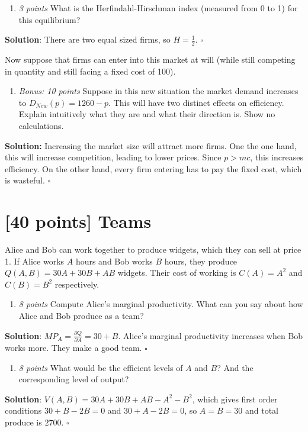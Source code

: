 \documentclass{article}
\begin{document}
\begin{enumerate}[resume*]
\item \textit{3 points }What is the Herfindahl-Hirschman index (measured from 0 to 1) for this equilibrium?\end{enumerate}
\textbf{Solution}:
There are two equal sized firms, so $H=\frac 12$. $\square$

Now suppose that firms can enter into this market at will (while still competing in quantity and still facing a fixed cost of 100).

\begin{enumerate}[resume*]
  \item \textit{Bonus: 10 points }Suppose in this new situation the market demand increases to $D_{New}(p)=1260-p$. This will have two distinct effects on efficiency. Explain intuitively what they are and what their direction is. Show no calculations. 
  \end{enumerate}
  \textbf{Solution:}
  Increasing the market size will attract more firms. One the one hand, this will increase competition, leading to lower prices. Since $p>mc$, this increases efficiency. On the other hand, every firm entering has to pay the fixed cost, which is wasteful. $\square$
  
\section{[40 points] Teams}

Alice and Bob can work together to produce widgets, which they can sell at price 1. If Alice works $A$ hours and Bob works $B$ hours, they produce $Q(A,B)=30A+30B+AB$ widgets. Their cost of working is $C(A)=A^{2}$ and $C(B)=B^{2}$ respectively. 

\begin{enumerate}[label=(\alph*)]
\item \textit{8 points }Compute Alice's marginal productivity. What can you say about how Alice and Bob produce as a team? \end{enumerate}
\textbf{Solution}:
$MP_{A}=\frac{\partial Q}{\partial A}=30+B$. Alice's marginal productivity increases when Bob works more. They make a good team. $\square$

\begin{enumerate}[resume*]
\item \textit{8 points }What would be the efficient levels of $A$ and $B$? And the corresponding level of output?\end{enumerate}
\textbf{Solution}:
$V(A,B)=30A+30B+AB-A^{2}-B^{2}$, which gives first order conditions $30+B-2B=0$ and $30+A-2B=0$, so $A=B=30$ and total produce is $2700$. $\square$
\end{document}
